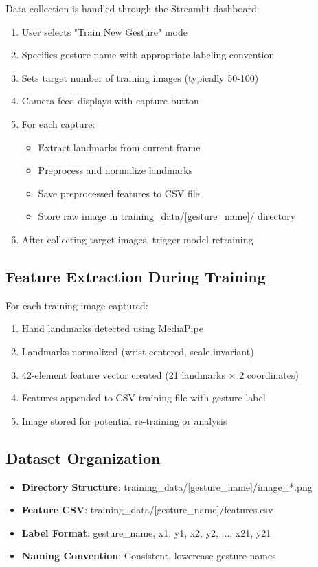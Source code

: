 Data collection is handled through the Streamlit dashboard:
\begin{enumerate}
    \item User selects "Train New Gesture" mode
    \item Specifies gesture name with appropriate labeling convention
    \item Sets target number of training images (typically 50-100)
    \item Camera feed displays with capture button
    \item For each capture:
    \begin{itemize}
        \item Extract landmarks from current frame
        \item Preprocess and normalize landmarks
        \item Save preprocessed features to CSV file
        \item Store raw image in training\_data/[gesture\_name]/ directory
    \end{itemize}
    \item After collecting target images, trigger model retraining
\end{enumerate}

\subsection{Feature Extraction During Training}

For each training image captured:
\begin{enumerate}
    \item Hand landmarks detected using MediaPipe
    \item Landmarks normalized (wrist-centered, scale-invariant)
    \item 42-element feature vector created (21 landmarks × 2 coordinates)
    \item Features appended to CSV training file with gesture label
    \item Image stored for potential re-training or analysis
\end{enumerate}

\subsection{Dataset Organization}

\begin{itemize}
    \item \textbf{Directory Structure}: training\_data/[gesture\_name]/image\_*.png
    \item \textbf{Feature CSV}: training\_data/[gesture\_name]/features.csv
    \item \textbf{Label Format}: gesture\_name, x1, y1, x2, y2, ..., x21, y21
    \item \textbf{Naming Convention}: Consistent, lowercase gesture names
\end{itemize}

